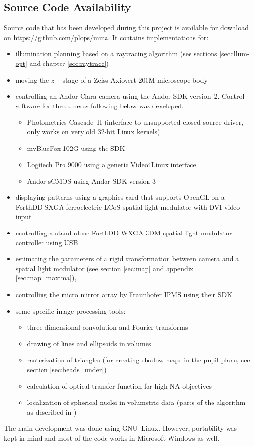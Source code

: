 \documentclass[oneside,a4paper,12pt,BCOR20mm,DIV14]{scrbook} %
\begin{document}
\subsection*{Source Code Availability}
Source code that has been developed during this project is available
for download on \url{https://github.com/plops/mma}.  It contains implementations
for:
\begin{itemize}
\item illumination planning based on a raytracing algorithm (see
  sections \ref{sec:illum-opt} and chapter \ref{sec:raytrace})
\item moving the $z-$stage of a Zeiss Axiovert 200M microscope body
\item controlling an Andor Clara camera using the Andor SDK
  version~2. Control software for the cameras following below was
  developed:
  \begin{itemize}
  \item Photometrics Cascade~II (interface to unsupported
    closed-source driver, only works on very old 32-bit Linux kernels)
  \item mvBlueFox 102G using the SDK
  \item Logitech Pro 9000 using a generic Video4Linux interface
  \item Andor sCMOS using Andor SDK version 3
  \end{itemize}
\item displaying patterns using a graphics card that supports OpenGL
  on a ForthDD SXGA ferroelectric LCoS spatial light modulator with DVI video input
\item controlling a stand-alone ForthDD WXGA 3DM spatial light
  modulator controller using USB
\item estimating the parameters of a rigid transformation between
  camera and a spatial light modulator (see section \ref{sec:map} and appendix
  \ref{sec:map_maxima}),
\item controlling the micro mirror array by Fraunhofer IPMS using
  their SDK
\item some specific image processing tools:
  \begin{itemize}
  \item three-dimensional convolution and Fourier transforms
  \item drawing of lines and ellipsoids in volumes
  \item rasterization of triangles (for creating shadow maps in the
    pupil plane, see section \ref{sec:beads_under})
  \item calculation of optical transfer function for high NA
    objectives
  \item localization of spherical nuclei in volumetric data (parts of
    the algorithm as described in \citet{Santella2010})
  \end{itemize}
\end{itemize}
The main development was done using GNU~Linux. However, portability
was kept in mind and most of the code works in Microsoft Windows as
well.
\end{document}
